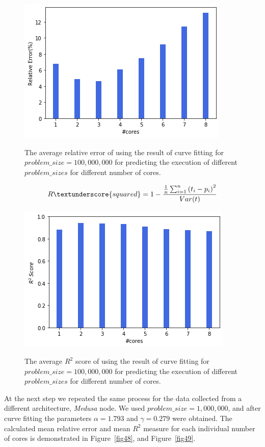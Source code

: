 \begin{figure}[H]
	\centering
	{\includegraphics[scale=.45]{images/hpx_for_loop/fitted/marvin_relative_error_all.png}}
	\caption{The average relative error of using the result of curve fitting for $problem\_size=100,000,000$ for predicting the execution of different $problem\_{sizes}$ for different number of cores.}\label{fig45}		
\end{figure}

\begin{equation}{\label{eq5}}
R\textunderscore{squared} = 1-\frac{{\frac{1}{n}\sum_{i=1}^{n}{(t_i-p_i)}^2}}{Var(t)}
\end{equation}

\begin{figure}[H]
	\centering
	{\includegraphics[scale=.45]{images/hpx_for_loop/fitted/marvin_r2_error_all.png}}
	\caption{The average $R^2$ score of using the result of curve fitting for $problem\_size=100,000,000$ for predicting the execution of different $problem\_{sizes}$ for different number of cores.}\label{fig46}		
\end{figure}

At the next step we repeated the same process for the data collected from a different architecture, \textit{Medusa} node.
We used $problem\_{size}=1,000,000$, and after curve fitting the parameters $\alpha=1.793$ and $\gamma=0.279$ were obtained. The calculated mean relative error and mean $R^2$ measure for each individual number of cores is demonstrated in Figure~\ref{fig48}, and Figure~\ref{fig49}.

